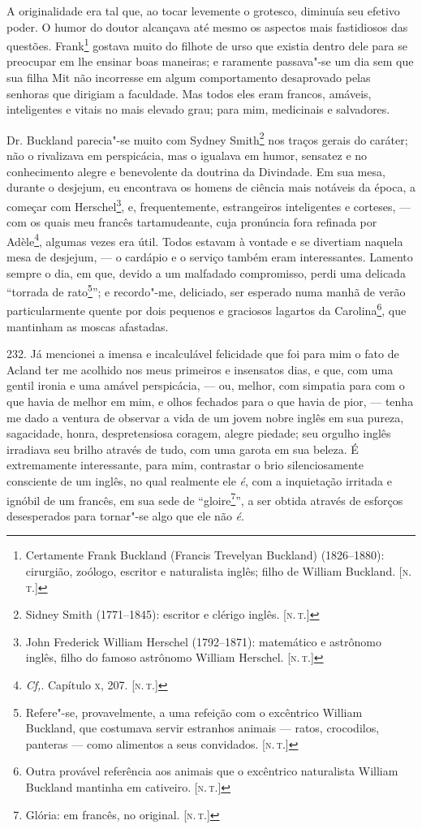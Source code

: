 A originalidade era tal que, ao tocar levemente o grotesco, diminuía seu
efetivo poder. O humor do doutor alcançava até mesmo os aspectos mais
fastidiosos das questões. Frank\footnote{Certamente Frank Buckland
  (Francis Trevelyan Buckland) (1826--1880): cirurgião, zoólogo, escritor
  e naturalista inglês; filho de William Buckland. {[}\textsc{n.\,t.}{]}}
gostava muito do filhote de urso que existia dentro dele para se
preocupar em lhe ensinar boas maneiras; e raramente passava"-se um dia
sem que sua filha Mit não incorresse em algum comportamento desaprovado
pelas senhoras que dirigiam a faculdade. Mas todos eles eram francos,
amáveis, inteligentes e vitais no mais elevado grau; para mim,
medicinais e salvadores.

Dr. Buckland parecia"-se muito com Sydney Smith\footnote{Sidney Smith
  (1771--1845): escritor e clérigo inglês. {[}\textsc{n.\,t.}{]}} nos traços
gerais do caráter; não o rivalizava em perspicácia, mas o igualava em
humor, sensatez e no conhecimento alegre e benevolente da doutrina da
Divindade. Em sua mesa, durante o desjejum, eu encontrava os homens de
ciência mais notáveis da época, a começar com Herschel\footnote{John
  Frederick William Herschel (1792--1871): matemático e astrônomo inglês,
  filho do famoso astrônomo William Herschel. {[}\textsc{n.\,t.}{]}}, e,
frequentemente, estrangeiros inteligentes e corteses, --- com os quais
meu francês tartamudeante, cuja pronúncia fora refinada por
Adèle\footnote{\emph{Cf,}. Capítulo \textsc{x}, 207. {[}\textsc{n.\,t.}{]}}, algumas
vezes era útil. Todos estavam à vontade e se divertiam naquela mesa de
desjejum, --- o cardápio e o serviço também eram interessantes. Lamento
sempre o dia, em que, devido a um malfadado compromisso, perdi uma
delicada ``torrada de rato\footnote{Refere"-se, provavelmente, a uma
  refeição com o excêntrico William Buckland, que costumava servir
  estranhos animais --- ratos, crocodilos, panteras --- como alimentos a
  seus convidados. {[}\textsc{n.\,t.}{]}}''; e recordo"-me, deliciado, ser
esperado numa manhã de verão particularmente quente por dois pequenos e
graciosos lagartos da Carolina\footnote{Outra provável referência aos
  animais que o excêntrico naturalista William Buckland mantinha em
  cativeiro. {[}\textsc{n.\,t.}{]}}, que mantinham as moscas afastadas.

232. Já mencionei a imensa e incalculável felicidade que foi para mim o
fato de Acland ter me acolhido nos meus primeiros e insensatos dias, e
que, com uma gentil ironia e uma amável perspicácia, --- ou, melhor, com
simpatia para com o que havia de melhor em mim, e olhos fechados para o
que havia de pior, --- tenha me dado a ventura de observar a vida de um
jovem nobre inglês em sua pureza, sagacidade, honra, despretensiosa
coragem, alegre piedade; seu orgulho inglês irradiava seu brilho através
de tudo, com uma garota em sua beleza. É extremamente interessante, para
mim, contrastar o brio silenciosamente consciente de um inglês, no qual
realmente ele \emph{é}, com a inquietação irritada e ignóbil de um
francês, em sua sede de ``gloire\footnote{Glória: em francês, no
  original. {[}\textsc{n.\,t.}{]}}'', a ser obtida através de esforços
desesperados para tornar"-se algo que ele não \emph{é}.

